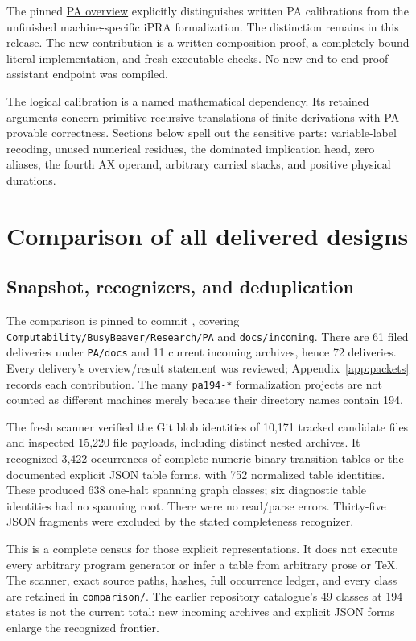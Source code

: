 \documentclass[10pt,letterpaper]{article}
\newcommand{\file}[1]{\texttt{\nolinkurl{#1}}}
\newcommand{\Repo}[2]{\href{https://github.com/VladimirReshetnikov/ProveIt/blob/4be5c6e3a10292a7466f5d3687e3b39615ff049b/#1}{#2}}
\begin{document}
The pinned
\Repo{Computability/BusyBeaver/Research/PA/README.md}{PA overview}
explicitly distinguishes written PA calibrations from the unfinished
machine-specific iPRA formalization. The distinction remains in this release.
The new contribution is a written composition proof, a completely bound
literal implementation, and fresh executable checks. No new end-to-end
proof-assistant endpoint was compiled.

The logical calibration is a named mathematical dependency.
Its retained arguments concern primitive-recursive translations of finite
derivations with PA-provable correctness. Sections below spell out the
sensitive parts: variable-label recoding, unused numerical residues, the
dominated implication head, zero aliases, the fourth AX operand, arbitrary
carried stacks, and positive physical durations.

\section{Comparison of all delivered designs}
\label{sec:comparison}

\subsection{Snapshot, recognizers, and deduplication}

The comparison is pinned to commit
, covering
\file{Computability/BusyBeaver/Research/PA} and \file{docs/incoming}.
There are 61 filed deliveries under \file{PA/docs} and 11 current incoming
archives, hence 72 deliveries. Every delivery's overview/result statement
was reviewed; Appendix~\ref{app:packets} records each contribution.
The many \file{pa194-*} formalization projects are not counted as different
machines merely because their directory names contain 194.

The fresh scanner verified the Git blob identities of 10,171 tracked
candidate files and inspected 15,220 file payloads, including distinct
nested archives. It recognized 3,422 occurrences of complete numeric
binary transition tables or the documented explicit JSON table forms,
with 752 normalized table identities. These produced 638 one-halt
spanning graph classes; six diagnostic table identities had no spanning
root. There were no read/parse errors. Thirty-five JSON fragments were
excluded by the stated completeness recognizer.

This is a complete census for those explicit representations. It does not
execute every arbitrary program generator or infer a table from arbitrary
prose or TeX. The scanner, exact source paths, hashes, full occurrence
ledger, and every class are retained in \file{comparison/}.
The earlier repository catalogue's 49 classes at 194 states is not the
current total: new incoming archives and explicit JSON forms enlarge
the recognized frontier.
\end{document}

